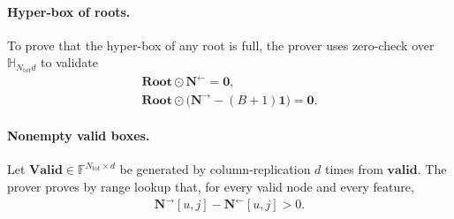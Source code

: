 \paragraph{Hyper-box of roots.}
To prove that the hyper-box of any root is full, the prover uses zero-check over $\mathbb{H}_{N_{\mathrm{tot}}d}$ to validate
    \begin{align}
        \mathbf{Root} \odot \mathbf{N}^{\leftarrow} = \mathbf{0}, \\
        \mathbf{Root} \odot \bigl(\mathbf{N}^{\rightarrow} - (B + 1)\mathbf{1}\bigr) = \mathbf{0}.
    \end{align}

\paragraph{Nonempty valid boxes.}
Let $\mathbf{Valid}\in\mathbb{F}^{N_{\mathrm{tot}}\times d}$ be generated by
column-replication $d$ times from $\mathbf{valid}$.  The prover proves by range
lookup that, for every valid node and every feature,
\begin{align}
    \mathbf{N}^{\rightarrow}[u,j]-\mathbf{N}^{\leftarrow}[u,j] > 0.
\end{align}

